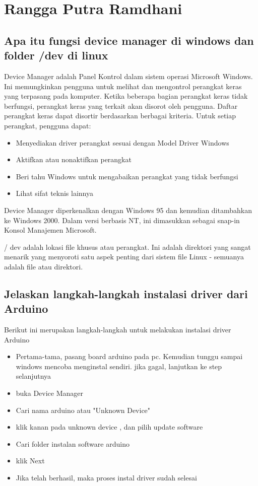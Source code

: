 \section{Rangga Putra Ramdhani}
\subsection{ Apa itu fungsi device manager di windows dan folder /dev di linux}
Device Manager adalah Panel Kontrol dalam sistem operasi Microsoft Windows. Ini memungkinkan pengguna untuk melihat dan mengontrol perangkat keras yang terpasang pada komputer. Ketika beberapa bagian perangkat keras tidak berfungsi, perangkat keras yang terkait akan disorot oleh pengguna. Daftar perangkat keras dapat disortir berdasarkan berbagai kriteria.
Untuk setiap perangkat, pengguna dapat:
\begin{itemize}
     \item Menyediakan driver perangkat sesuai dengan Model Driver Windows
     \item Aktifkan atau nonaktifkan perangkat
     \item Beri tahu Windows untuk mengabaikan perangkat yang tidak berfungsi
     \item Lihat sifat teknis lainnya
\end{itemize}
Device Manager diperkenalkan dengan Windows 95 dan kemudian ditambahkan ke Windows 2000. Dalam versi berbasis NT, ini dimasukkan sebagai snap-in Konsol Manajemen Microsoft.\newline

/ dev adalah lokasi file khusus atau perangkat. Ini adalah direktori yang sangat menarik yang menyoroti satu aspek penting dari sistem file Linux - semuanya adalah file atau direktori.


\subsection{Jelaskan langkah-langkah instalasi driver dari Arduino}
Berikut ini merupakan langkah-langkah untuk melakukan instalasi driver Arduino
\begin{itemize}
	\item Pertama-tama, pasang board arduino pada pc. Kemudian tunggu sampai windows mencoba menginstal sendiri. jika gagal, lanjutkan ke step selanjutnya
	\item buka Device Manager 
	\item Cari nama arduino atau "Unknown Device"
	\item klik kanan pada unknown device , dan pilih update software
	\item Cari folder instalan software arduino
	\item klik Next
	\item Jika telah berhasil, maka proses instal driver sudah selesai
\end{itemize}

